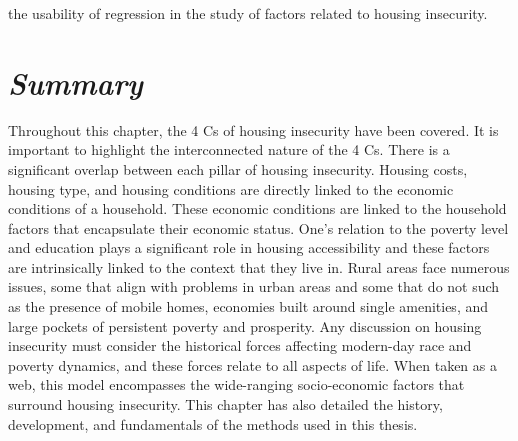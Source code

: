 the usability of regression in the study of factors related to housing insecurity. 


\section{\textit{Summary}} 

Throughout this chapter, the 4 Cs of housing insecurity have been covered. It is important to highlight the interconnected nature of the 4 Cs. There is a significant overlap between each pillar of housing insecurity. Housing costs, housing type, and housing conditions are directly linked to the economic conditions of a household. These economic conditions are linked to the household factors that encapsulate their economic status. One's relation to the poverty level and education plays a significant role in housing accessibility and these factors are intrinsically linked to the context that they live in. Rural areas face numerous issues, some that align with problems in urban areas and some that do not such as the presence of mobile homes, economies built around single amenities, and large pockets of persistent poverty and prosperity. Any discussion on housing insecurity must consider the historical forces affecting modern-day race and poverty dynamics, and these forces relate to all aspects of life. When taken as a web, this model encompasses the wide-ranging socio-economic factors that surround housing insecurity. This chapter has also detailed the history, development, and fundamentals of the methods used in this thesis.  

 

\endinput 

 